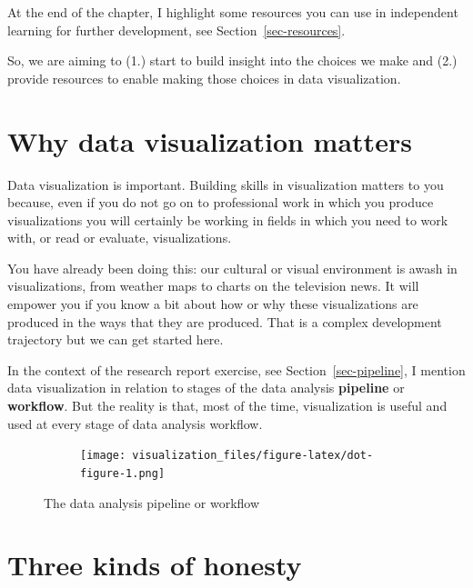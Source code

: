 \documentclass[
  letterpaper,
  DIV=11,
  numbers=noendperiod]{scrreprt}
\begin{document}
At the end of the chapter, I highlight some resources you can use in
independent learning for further development, see
Section~\ref{sec-resources}.

So, we are aiming to (1.) start to build insight into the choices we
make and (2.) provide resources to enable making those choices in data
visualization.

\hypertarget{sec-why-visualization-matters}{%
\section{Why data visualization
matters}\label{sec-why-visualization-matters}}

Data visualization is important. Building skills in visualization
matters to you because, even if you do not go on to professional work in
which you produce visualizations you will certainly be working in fields
in which you need to work with, or read or evaluate, visualizations.

You have already been doing this: our cultural or visual environment is
awash in visualizations, from weather maps to charts on the television
news. It will empower you if you know a bit about how or why these
visualizations are produced in the ways that they are produced. That is
a complex development trajectory but we can get started here.

In the context of the research report exercise, see
Section~\ref{sec-pipeline}, I mention data visualization in relation to
stages of the data analysis \textbf{pipeline} or \textbf{workflow}. But
the reality is that, most of the time, visualization is useful and used
at every stage of data analysis workflow.

\begin{figure}

{\centering 

\begin{figure}[H]

{\centering \texttt{[image: visualization\_files/figure-latex/dot-figure-1.png]}

}

\end{figure}

}

\caption{\label{fig-pipeline}The data analysis pipeline or workflow}

\end{figure}

\hypertarget{sec-honesty}{%
\section{Three kinds of honesty}\label{sec-honesty}}
\end{document}
